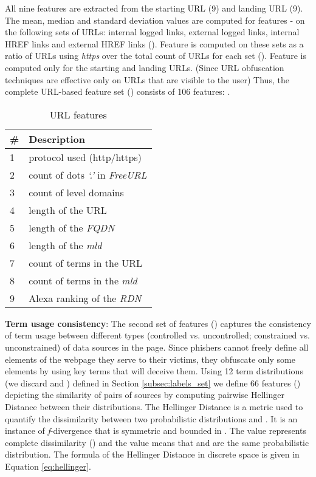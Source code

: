 \documentclass[10pt,conference,compsocconf,letterpaper]{IEEEtran}
\begin{document}
All nine features are extracted from the starting URL (9) and landing URL (9). The mean, median and standard deviation values are computed for features - on the following sets of URLs: internal logged links, external logged links, internal HREF links and external HREF links (). Feature  is computed on these sets as a ratio of URLs using \textit{https} over the total count of URLs for each set (). Feature  is computed only for the starting and landing URLs.
\iffullversion
(Since URL obfuscation techniques are effective only on URLs that are visible to the user)
\fi
Thus, the complete URL-based feature set () consists of 106 features: .

\begin{table}[tbh]
\caption{URL features} \centering
\begin{tabular}{l l}

\# & \textbf{Description} \\ \hline
1 & protocol used (http/https) \\
2 & count of dots \textit{`.'} in \textit{FreeURL} \\
3 & count of level domains \\
4 & length of the URL \\
5 & length of the \textit{FQDN} \\
6 & length of the \textit{mld} \\
7 & count of terms in the URL \\
8 & count of terms in the \textit{mld} \\
9 & Alexa ranking of the \textit{RDN}

\end{tabular}
\label{tab:url_features}
\end{table}

\noindent\textbf{Term usage consistency}: The second set of features () captures the consistency of term usage between different types (controlled vs. uncontrolled; constrained vs. unconstrained) of data sources in the page. 
\iffullversion
Since phishers cannot freely define all elements of the webpage they serve to their victims, they obfuscate only some elements by using key terms that will deceive them. 
\fi
Using 12 term distributions (we discard  and ) defined in Section \ref{subsec:labels_set} we define 66 features () depicting the similarity of pairs of sources by computing pairwise Hellinger Distance between their distributions.
The Hellinger Distance \cite{cam:2000:asymptotics} is a metric used to quantify the dissimilarity between two probabilistic distributions  and . It is an instance of \textit{f}-divergence that is symmetric and bounded in . The value  represents complete dissimilarity () and the value  means that   and  are the same probabilistic distribution. 
\iffeateval
The formula of the Hellinger Distance in discrete space is given in Equation \eqref{eq:hellinger}.
\end{document}
